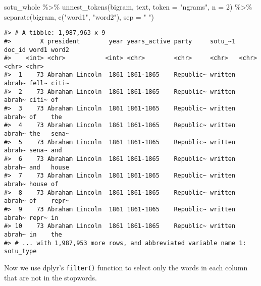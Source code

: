 \documentclass[
]{book}
\newenvironment{Shaded}{\begin{snugshade}}{\end{snugshade}}
\newcommand{\AttributeTok}[1]{\textcolor[rgb]{0.77,0.63,0.00}{#1}}
\newcommand{\CommentTok}[1]{\textcolor[rgb]{0.56,0.35,0.01}{\textit{#1}}}
\newcommand{\DecValTok}[1]{\textcolor[rgb]{0.00,0.00,0.81}{#1}}
\newcommand{\FunctionTok}[1]{\textcolor[rgb]{0.00,0.00,0.00}{#1}}
\newcommand{\NormalTok}[1]{#1}
\newcommand{\SpecialCharTok}[1]{\textcolor[rgb]{0.00,0.00,0.00}{#1}}
\newcommand{\StringTok}[1]{\textcolor[rgb]{0.31,0.60,0.02}{#1}}
\begin{document}
\begin{Shaded}
\begin{Highlighting}[]
\NormalTok{sotu\_whole }\SpecialCharTok{\%\textgreater{}\%}
  \FunctionTok{unnest\_tokens}\NormalTok{(bigram, text, }\AttributeTok{token =} \StringTok{"ngrams"}\NormalTok{, }\AttributeTok{n =} \DecValTok{2}\NormalTok{) }\SpecialCharTok{\%\textgreater{}\%} 
  \FunctionTok{separate}\NormalTok{(bigram, }\FunctionTok{c}\NormalTok{(}\StringTok{"word1"}\NormalTok{, }\StringTok{"word2"}\NormalTok{), }\AttributeTok{sep =} \StringTok{" "}\NormalTok{)}
\end{Highlighting}
\end{Shaded}

\begin{verbatim}
#> # A tibble: 1,987,963 x 9
#>        X president        year years_active party     sotu_~1 doc_id word1 word2
#>    <int> <chr>           <int> <chr>        <chr>     <chr>   <chr>  <chr> <chr>
#>  1    73 Abraham Lincoln  1861 1861-1865    Republic~ written abrah~ fell~ citi~
#>  2    73 Abraham Lincoln  1861 1861-1865    Republic~ written abrah~ citi~ of   
#>  3    73 Abraham Lincoln  1861 1861-1865    Republic~ written abrah~ of    the  
#>  4    73 Abraham Lincoln  1861 1861-1865    Republic~ written abrah~ the   sena~
#>  5    73 Abraham Lincoln  1861 1861-1865    Republic~ written abrah~ sena~ and  
#>  6    73 Abraham Lincoln  1861 1861-1865    Republic~ written abrah~ and   house
#>  7    73 Abraham Lincoln  1861 1861-1865    Republic~ written abrah~ house of   
#>  8    73 Abraham Lincoln  1861 1861-1865    Republic~ written abrah~ of    repr~
#>  9    73 Abraham Lincoln  1861 1861-1865    Republic~ written abrah~ repr~ in   
#> 10    73 Abraham Lincoln  1861 1861-1865    Republic~ written abrah~ in    the  
#> # ... with 1,987,953 more rows, and abbreviated variable name 1: sotu_type
\end{verbatim}

Now we use dplyr's \texttt{filter()} function to select only the words in each column that are not in the stopwords.

\begin{Shaded}
\end{Shaded}
\end{document}
